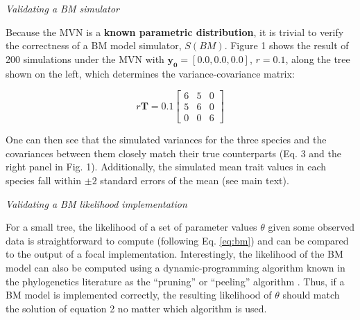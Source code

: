 \documentclass[oneside]{article}
\begin{document}
\begin{tcolorbox}[breakable, width=12cm, colback=gray!10, boxrule=0pt,
  break at=11cm/0cm, title=Box 1: Models with well-known parametric \emph{pdf}'s, fonttitle=\bfseries]
\vspace{.25cm}
\emph{Validating a BM simulator}

Because the MVN is a \textbf{known parametric
  distribution}, it is trivial to verify the correctness of a
BM model simulator, $S(BM)$.
Figure 1 shows the result of 200 simulations under the MVN
with $\mathbf{y_0} = [0.0, 0.0, 0.0]$, $r = 0.1$, along the tree shown on
the left, which determines the variance-covariance matrix:

\begin{equation}
  r\mathbf{T} = 0.1
  \begin{bmatrix}
    6 & 5 & 0\\
    5 & 6 & 0\\
    0 & 0 & 6
  \end{bmatrix}
  \label{eq:mat}
\end{equation}

One can then see that the simulated variances for the three species
and the covariances between them closely match their true counterparts
(Eq. 3 and the right panel in Fig. 1).
Additionally, the simulated mean trait values in each species fall
within $\pm 2$
standard errors of the mean (see main text).

\vspace{.25cm}
\emph{Validating a BM likelihood implementation}

For a small tree, the likelihood of a set
of parameter values $\theta$ given some observed data is
straightforward to compute (following Eq. \ref{eq:bm}) and can be compared to
the output of a focal implementation.
Interestingly, the likelihood of the BM model can also be computed using a
dynamic-programming algorithm known in the phylogenetics literature
as the ``pruning'' or ``peeling'' algorithm \citep{felsenstein73}.
Thus, if a BM model is implemented correctly, the resulting likelihood
of $\theta$ should match the solution of equation 2 no matter
which algorithm is used.

\end{tcolorbox}

\end{document}
